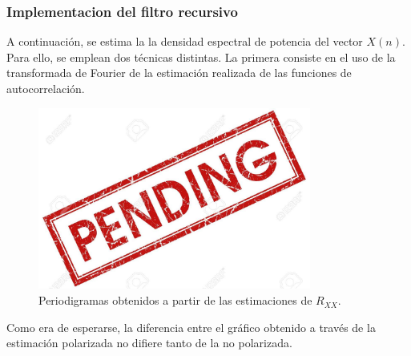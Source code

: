 \subsubsection{Implementacion del filtro recursivo}
A continuación, se estima la la densidad espectral de potencia del vector $X(n)$. Para ello, se emplean dos técnicas distintas. La primera consiste en el uso de la transformada de Fourier de la estimación realizada de las funciones de autocorrelación.
\begin{figure}[H]
\centering
	\includegraphics[width=0.8\textwidth, trim = {0 0 0 0},clip]{./Imagenes/pend.jpg}
	\caption{Periodigramas obtenidos a partir de las estimaciones de $R_{XX}$.}
	\label{fig:period-est}
\end{figure}


Como era de esperarse, la diferencia entre el gráfico obtenido a través de la estimación polarizada no difiere tanto de la no polarizada.

